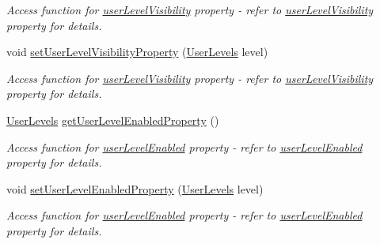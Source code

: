 \begin{DoxyCompactItemize}
\begin{DoxyCompactList}\small\item\em Access function for \hyperlink{classQEShape_aa02618ef4969857af73b0fc5278e2104}{userLevelVisibility} property -\/ refer to \hyperlink{classQEShape_aa02618ef4969857af73b0fc5278e2104}{userLevelVisibility} property for details. \end{DoxyCompactList}\item 
\hypertarget{classQEShape_ac23fe1da5f94a93050365b666c540884}{
void \hyperlink{classQEShape_ac23fe1da5f94a93050365b666c540884}{setUserLevelVisibilityProperty} (\hyperlink{classQEShape_a090921156d1b46560ff0fc1bacad18dd}{UserLevels} level)}
\label{classQEShape_ac23fe1da5f94a93050365b666c540884}

\begin{DoxyCompactList}\small\item\em Access function for \hyperlink{classQEShape_aa02618ef4969857af73b0fc5278e2104}{userLevelVisibility} property -\/ refer to \hyperlink{classQEShape_aa02618ef4969857af73b0fc5278e2104}{userLevelVisibility} property for details. \end{DoxyCompactList}\item 
\hypertarget{classQEShape_ab0b02eddd29694ee551982645e062053}{
\hyperlink{classQEShape_a090921156d1b46560ff0fc1bacad18dd}{UserLevels} \hyperlink{classQEShape_ab0b02eddd29694ee551982645e062053}{getUserLevelEnabledProperty} ()}
\label{classQEShape_ab0b02eddd29694ee551982645e062053}

\begin{DoxyCompactList}\small\item\em Access function for \hyperlink{classQEShape_a8b2158632ac9f2cd70692650c3cd594f}{userLevelEnabled} property -\/ refer to \hyperlink{classQEShape_a8b2158632ac9f2cd70692650c3cd594f}{userLevelEnabled} property for details. \end{DoxyCompactList}\item 
\hypertarget{classQEShape_acef3aad2ad905ecd2425fe669ca08d9b}{
void \hyperlink{classQEShape_acef3aad2ad905ecd2425fe669ca08d9b}{setUserLevelEnabledProperty} (\hyperlink{classQEShape_a090921156d1b46560ff0fc1bacad18dd}{UserLevels} level)}
\label{classQEShape_acef3aad2ad905ecd2425fe669ca08d9b}

\begin{DoxyCompactList}\small\item\em Access function for \hyperlink{classQEShape_a8b2158632ac9f2cd70692650c3cd594f}{userLevelEnabled} property -\/ refer to \hyperlink{classQEShape_a8b2158632ac9f2cd70692650c3cd594f}{userLevelEnabled} property for details. \end{DoxyCompactList}\end{DoxyCompactItemize}
